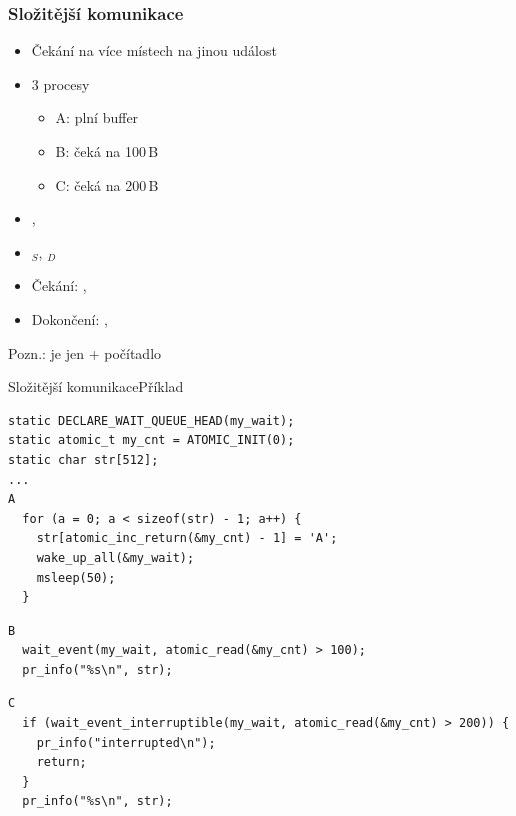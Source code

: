 \begin{frame}
  \frametitle{Složitější komunikace}

  \begin{itemize}
    \item Čekání na více místech na jinou událost
    \item 3 procesy
    \begin{itemize}
      \item A: plní buffer
      \item B: čeká na 100\,B
      \item C: čeká na 200\,B
    \end{itemize}
  \end{itemize}

  \pause

  \begin{itemize}
    \item {}, 
    \item {}$_S$,
      $_D$
    \item Čekání: , 
    \item Dokončení: , 
  \end{itemize}

  \pause
  \bigskip

  Pozn.:  je jen  + počítadlo

\end{frame}

\begin{frame}[fragile]{Složitější komunikace}{Příklad}

  \begin{lstlisting}
static DECLARE_WAIT_QUEUE_HEAD(my_wait);
static atomic_t my_cnt = ATOMIC_INIT(0);
static char str[512];
...
A
  for (a = 0; a < sizeof(str) - 1; a++) {
    str[atomic_inc_return(&my_cnt) - 1] = 'A';
    wake_up_all(&my_wait);
    msleep(50);
  }
  \end{lstlisting}

  \pause

  \begin{lstlisting}
B
  wait_event(my_wait, atomic_read(&my_cnt) > 100);
  pr_info("%s\n", str);
  \end{lstlisting} %

  \pause

  \begin{lstlisting}
C
  if (wait_event_interruptible(my_wait, atomic_read(&my_cnt) > 200)) {
    pr_info("interrupted\n");
    return;
  }
  pr_info("%s\n", str);
  \end{lstlisting} %

\end{frame}

